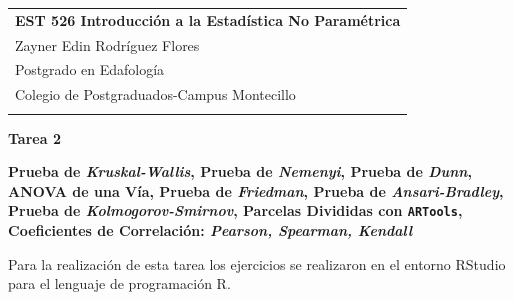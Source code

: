 \documentclass[a4paper,12pt]{article}
\begin{document}
	\thispagestyle{empty} %
	\begin{tabular}{p{15.5cm}} %
	{\large \bf EST 526 Introducción a la Estadística No Paramétrica} \\
			Zayner Edin Rodríguez Flores \\ Postgrado en Edafología  \\ Colegio de Postgraduados-Campus Montecillo\\
			\hline 
			\\
	\end{tabular} %
		
		\vspace*{0.1cm} %
\begin{center} 
	{\Large \bf Tarea 2} 
			\vspace{2mm}
	
	{ \bf Prueba de \textit{Kruskal-Wallis}, Prueba de \textit{Nemenyi}, Prueba de \textit{Dunn}, ANOVA de una Vía, Prueba de \textit{Friedman}, Prueba de \textit{Ansari-Bradley}, Prueba de \textit{Kolmogorov-Smirnov}, Parcelas Divididas con \texttt{ARTools}, Coeficientes de Correlación: \textit{Pearson, Spearman, Kendall}}
			
\end{center}  
	\vspace{0.4 cm}

Para la realización de esta tarea los ejercicios se realizaron en el entorno RStudio para el lenguaje de programación R.
\end{document}
